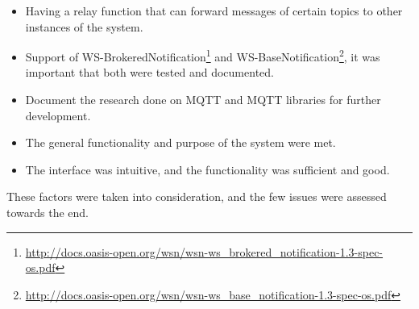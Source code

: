 \begin{itemize}
\item Having a relay function that can forward messages of certain topics to other instances of the system.
\item Support of WS-BrokeredNotification\footnote{\url{http://docs.oasis-open.org/wsn/wsn-ws_brokered_notification-1.3-spec-os.pdf}} and WS-BaseNotification\footnote{\url{http://docs.oasis-open.org/wsn/wsn-ws_base_notification-1.3-spec-os.pdf}}, it was important that both were tested and documented.
\item Document the research done on MQTT and MQTT libraries for further development.
\item The general functionality and purpose of the system were met.
\item The interface was intuitive, and the functionality was sufficient and good.
\end{itemize}

These factors were taken into consideration, and the few issues were assessed towards the end.

\clearpage
